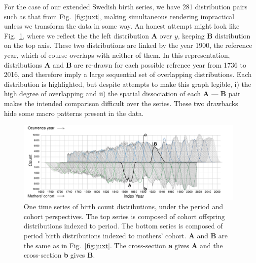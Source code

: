 \documentclass{article}
\begin{document}
For the case of our extended Swedish birth series, we have 281 distribution pairs such as that from Fig.~\ref{fig:juxt}, making simultaneous rendering impractical unless we transform the data in some way. An honest attempt might look like Fig.~\ref{fig:reflect1}, where we reflect the the left distribution \textbf{A} over $y$, keeping  \textbf{B} distribution on the top axis. These two distributions are linked by the year 1900, the reference year, which of course overlaps with neither of them. In this representation, distributions \textbf{A} and \textbf{B} are re-drawn for each possible refrence year from 1736 to 2016, and therefore imply a large sequential set of overlapping distributions. Each  distribution is highlighted, but despite attempts to make this graph legible, i) the high degree of overlapping and ii) the spatial dissociation of each \textbf{A} --- \textbf{B} pair makes the intended comparison difficult over the series. These two drawbacks hide some macro patterns present in the data.

\begin{figure}[ht!]
 \centering
        \includegraphics[width=\textwidth]{Figures/FxFlowReflect.pdf}
        \caption{One time series of birth count distributions, under the period and cohort perspectives. The top series is composed of cohort offspring distributions indexed to period. The bottom series is composed of period birth distributions indexed to mothers' cohort. \textbf{A} and \textbf{B} are the same as in Fig.~\ref{fig:juxt}. The cross-section \textbf{a} gives \textbf{A} and the cross-section \textbf{b} gives \textbf{B}.}
          \label{fig:reflect1}
\end{figure}
\end{document}
